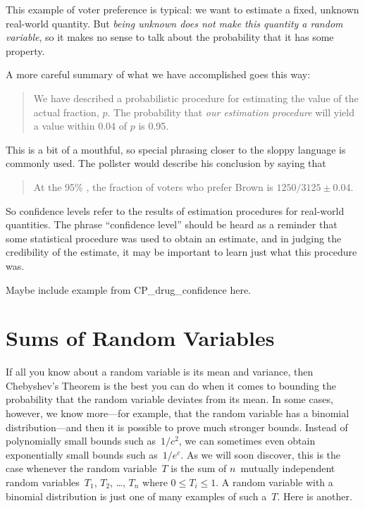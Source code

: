 This example of voter preference is typical: we want to estimate a fixed,
unknown real-world quantity.  But \emph{being unknown does not make this
  quantity a random variable}, so it makes no sense to talk about the
probability that it has some property.

A more careful summary of what we have accomplished goes this way:
\begin{quote}
We have described a probabilistic procedure for estimating the value of
the actual fraction, $p$.  The probability that \emph{our estimation
procedure} will yield a value within 0.04 of $p$ is 0.95.
\end{quote}
This is a bit of a mouthful, so special phrasing closer to the sloppy
language is commonly used.  The pollster would describe his conclusion by
saying that
\begin{quote}
At the 95\% , the fraction of voters
who prefer Brown is $1250/3125 \pm 0.04$.
\end{quote}

So confidence levels refer to the results of estimation procedures for
real-world quantities.  The phrase ``confidence level'' should be heard as
a reminder that some statistical procedure was used to obtain an estimate,
and in judging the credibility of the estimate, it may be important to
learn just what this procedure was.

\begin{editingnotes}
Maybe include example from CP\_drug\_confidence here.
\end{editingnotes}

\begin{problems}

\classproblems
{}

\examproblems
{}

\end{problems}

\section{Sums of Random Variables}

If all you know about a random variable is its mean and variance, then
Chebyshev's Theorem is the best you can do when it comes to bounding
the probability that the random variable deviates from its mean.  In
some cases, however, we know more---for example, that the random
variable has a binomial distribution---and then it is possible to
prove much stronger bounds.  Instead of polynomially small bounds such
as~$1/c^2$, we can sometimes even obtain exponentially small bounds
such as~$1/e^c$.  As we will soon discover, this is the case whenever
the random variable~$T$ is the sum of $n$~mutually independent random
variables~$T_1$, $T_2$, \dots, $T_n$ where $0 \le T_i \le 1$.  A
random variable with a binomial distribution is just one of many
examples of such a~$T$.  Here is another.

